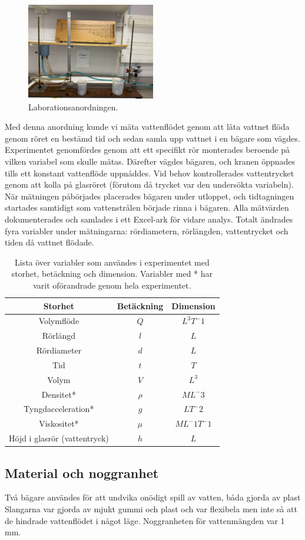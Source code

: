 \documentclass[a4paper,12pt]{article}
\begin{document}
    
    \begin{figure}[h]
        \centering
        \includegraphics[width=0.5\textwidth]{Labb-yta.jpg}
        \caption{Laborationsanordningen.}
        \label{fig:experiment_setup}
    \end{figure}
    Med denna anordning kunde vi mäta vattenflödet genom att låta vattnet flöda genom röret en bestämd tid och sedan samla upp vattnet i en bägare som vägdes.
    Experimentet genomfördes genom att ett specifikt rör monterades beroende på vilken variabel som skulle mätas. Därefter vägdes bägaren, och kranen öppnades tills ett konstant vattenflöde uppnåddes. Vid behov kontrollerades vattentrycket genom att kolla på glasröret (förutom då trycket var den undersökta variabeln).
    När mätningen påbörjades placerades bägaren under utloppet, och tidtagningen startades samtidigt som vattenstrålen började rinna i bägaren. Alla mätvärden dokumenterades och samlades i ett Excel-ark för vidare analys. Totalt ändrades fyra variabler under mätningarna: rördiametern, rörlängden, vattentrycket och tiden då vattnet flödade.
\clearpage
\begin{table}[h!]
    \centering
    \begin{tabular}{|c|c|c|}
        \hline
            \textbf{Storhet} & \textbf{Betäckning} & \textbf{Dimension}\\ \hline
            Volymflöde & $Q$ & $L^3T^-1$\\ \hline
            Rörlängd & $l$ & $L$\\ \hline
            Rördiameter & $d$ & $L$\\ \hline
            Tid & $t$ & $T$\\ \hline
            Volym & $V$ & $L^3$\\ \hline
            Densitet* & $\rho$ & $ML^-3$\\ \hline
            Tyngdacceleration* & $g$ & $LT^-2$\\ \hline
            Viskositet* & $\mu$ & $ML^-1T^-1$\\ \hline
            Höjd i glasrör (vattentryck) & $h$ & $L$\\ \hline
    \end{tabular}
    \caption{Lista över variabler som användes i experimentet med storhet, betäckning och dimension. Variabler med * har varit oförandrade genom hela experimentet.}
    \label{tab:Variabellista}
\end{table}
\subsection{Material och noggranhet}
    Två bägare användes för att undvika onödigt spill av vatten, båda gjorda av plast Slangarna var gjorda av mjukt gummi och plast och var flexibela men inte så att de hindrade vattenflödet i något läge. Noggranheten för vattenmängden var 1 mm.
\end{document}
